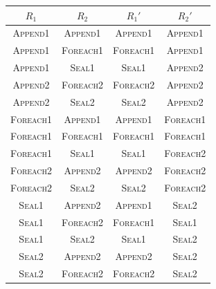 \documentclass[runningheads,a4paper]{llncs}
\begin{document}
\begin{lemma}[Commutativity]
\begin{center}
\begin{tabular}{ | c | c | c | c | }
  \hline
  $R_1$ & $R_2$ & $R_1'$ & $R_2'$ \\
  \hline
  \hline
  \textsc{Append1} & \textsc{Append1} & \textsc{Append1} & \textsc{Append1} \\
  \hline
  \textsc{Append1} & \textsc{Foreach1} & \textsc{Foreach1} & \textsc{Append1} \\
  \hline
  \textsc{Append1} & \textsc{Seal1} & \textsc{Seal1} & \textsc{Append2} \\
  \hline
  \textsc{Append2} & \textsc{Foreach2} & \textsc{Foreach2} & \textsc{Append2} \\
  \hline
  \textsc{Append2} & \textsc{Seal2} & \textsc{Seal2} & \textsc{Append2} \\
  \hline
  \textsc{Foreach1} & \textsc{Append1} & \textsc{Append1} & \textsc{Foreach1} \\
  \hline
  \textsc{Foreach1} & \textsc{Foreach1} & \textsc{Foreach1} & \textsc{Foreach1} \\
  \hline
  \textsc{Foreach1} & \textsc{Seal1} & \textsc{Seal1} & \textsc{Foreach2} \\
  \hline
  \textsc{Foreach2} & \textsc{Append2} & \textsc{Append2} & \textsc{Foreach2} \\
  \hline
  \textsc{Foreach2} & \textsc{Seal2} & \textsc{Seal2} & \textsc{Foreach2} \\
  \hline
  \textsc{Seal1} & \textsc{Append2} & \textsc{Append1} & \textsc{Seal2} \\
  \hline
  \textsc{Seal1} & \textsc{Foreach2} & \textsc{Foreach1} & \textsc{Seal1} \\
  \hline
  \textsc{Seal1} & \textsc{Seal2} & \textsc{Seal1} & \textsc{Seal2} \\
  \hline
  \textsc{Seal2} & \textsc{Append2} & \textsc{Append2} & \textsc{Seal2} \\
  \hline
  \textsc{Seal2} & \textsc{Foreach2} & \textsc{Foreach2} & \textsc{Seal2} \\
  \hline
\end{tabular}
\end{center}

\end{lemma}
\end{document}
